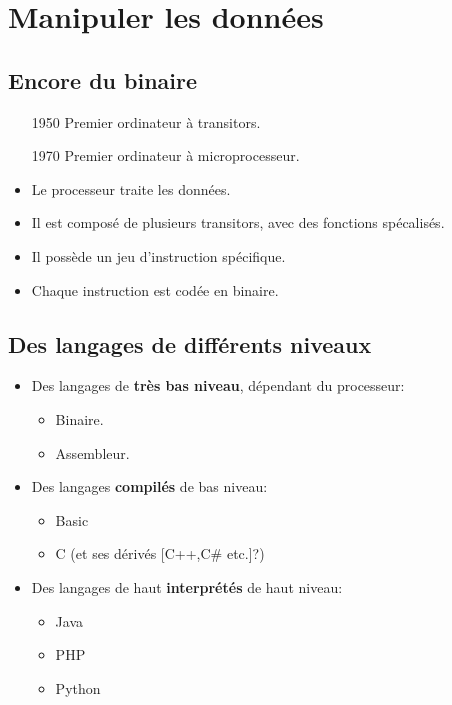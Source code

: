 \section[Manipuler]{Manipuler les données}
\subsection{Encore du binaire}

\begin{slide}
	\begin{itemize}
		\item[1950] Premier ordinateur à transitors.
		\item[1970] Premier ordinateur à microprocesseur. %
	\end{itemize}
\end{slide}

\begin{slide}
	\begin{itemize}
		\item Le processeur traite les données.
		\item Il est composé de plusieurs transitors, avec des fonctions spécalisés.
		\item Il possède un jeu d'instruction spécifique.
		\item Chaque instruction est codée en binaire.
	\end{itemize}
\end{slide}

\subsection{Des langages de différents niveaux}

\begin{slide}
	\begin{itemize}
		\item Des langages de \textbf{très bas niveau}, dépendant du processeur:
		\begin{itemize}
			\item Binaire.
			\item Assembleur.
		\end{itemize}
		\item Des langages \textbf{compilés} de bas niveau:
		\begin{itemize}
			\item Basic
			\item C (et ses dérivés [C++,C\# etc.]?)
		\end{itemize}
		\item Des langages de haut \textbf{interprétés} de haut niveau:
		\begin{itemize}
			\item Java
			\item PHP
			\item Python
		\end{itemize}
	\end{itemize}
\end{slide}


